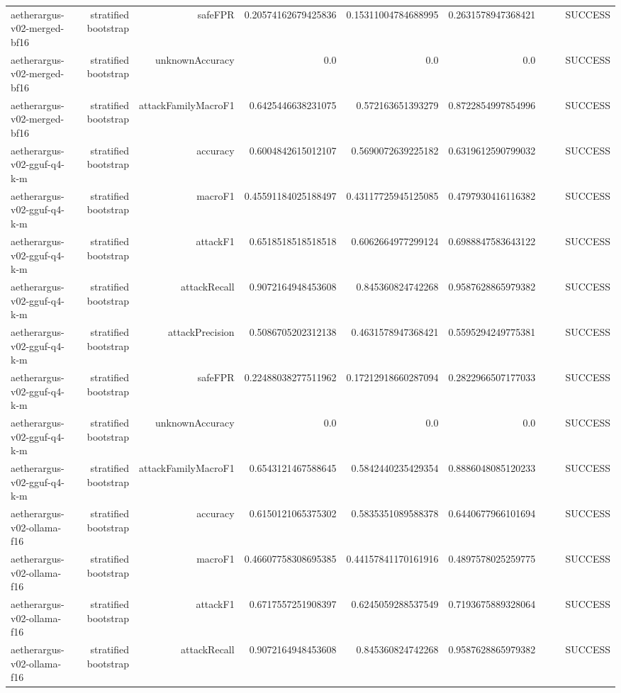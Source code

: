 \begin{table}[t]
\begin{tabular}{lrrrrrrrr}
aetherargus-v02-merged-bf16 & stratified bootstrap & safeFPR & 0.20574162679425836 & 0.15311004784688995 & 0.2631578947368421 &  &  & SUCCESS \\
aetherargus-v02-merged-bf16 & stratified bootstrap & unknownAccuracy & 0.0 & 0.0 & 0.0 &  &  & SUCCESS \\
aetherargus-v02-merged-bf16 & stratified bootstrap & attackFamilyMacroF1 & 0.6425446638231075 & 0.572163651393279 & 0.8722854997854996 &  &  & SUCCESS \\
aetherargus-v02-gguf-q4-k-m & stratified bootstrap & accuracy & 0.6004842615012107 & 0.5690072639225182 & 0.6319612590799032 &  &  & SUCCESS \\
aetherargus-v02-gguf-q4-k-m & stratified bootstrap & macroF1 & 0.45591184025188497 & 0.43117725945125085 & 0.4797930416116382 &  &  & SUCCESS \\
aetherargus-v02-gguf-q4-k-m & stratified bootstrap & attackF1 & 0.6518518518518518 & 0.6062664977299124 & 0.6988847583643122 &  &  & SUCCESS \\
aetherargus-v02-gguf-q4-k-m & stratified bootstrap & attackRecall & 0.9072164948453608 & 0.845360824742268 & 0.9587628865979382 &  &  & SUCCESS \\
aetherargus-v02-gguf-q4-k-m & stratified bootstrap & attackPrecision & 0.5086705202312138 & 0.4631578947368421 & 0.5595294249775381 &  &  & SUCCESS \\
aetherargus-v02-gguf-q4-k-m & stratified bootstrap & safeFPR & 0.22488038277511962 & 0.17212918660287094 & 0.2822966507177033 &  &  & SUCCESS \\
aetherargus-v02-gguf-q4-k-m & stratified bootstrap & unknownAccuracy & 0.0 & 0.0 & 0.0 &  &  & SUCCESS \\
aetherargus-v02-gguf-q4-k-m & stratified bootstrap & attackFamilyMacroF1 & 0.6543121467588645 & 0.5842440235429354 & 0.8886048085120233 &  &  & SUCCESS \\
aetherargus-v02-ollama-f16 & stratified bootstrap & accuracy & 0.6150121065375302 & 0.5835351089588378 & 0.6440677966101694 &  &  & SUCCESS \\
aetherargus-v02-ollama-f16 & stratified bootstrap & macroF1 & 0.46607758308695385 & 0.44157841170161916 & 0.4897578025259775 &  &  & SUCCESS \\
aetherargus-v02-ollama-f16 & stratified bootstrap & attackF1 & 0.6717557251908397 & 0.6245059288537549 & 0.7193675889328064 &  &  & SUCCESS \\
aetherargus-v02-ollama-f16 & stratified bootstrap & attackRecall & 0.9072164948453608 & 0.845360824742268 & 0.9587628865979382 &  &  & SUCCESS \\

\end{tabular}
\end{table}
